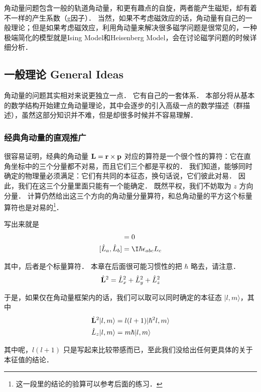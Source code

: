 
角动量问题包含一般的轨道角动量，和更有趣点的自旋，两者能产生磁矩，却有着不一样的产生系数（g因子）． 当然，如果不考虑磁效应的话，角动量有自己的一般理论；但是如果考虑磁效应，利用角动量来解决很多磁学问题是很常见的，一种极端简化的模型就是Ising Model和Heisenberg Model，会在讨论磁学问题的时候详细分析．

\subsection{一般理论 General Ideas}

角动量的问题其实相对来说更独立一点． 它有自己的一套体系． 本部分将从基本的数学结构开始建立角动量理论，其中会逐步的引入高级一点的数学描述（群描述），虽然这部分知识并不难，但是却很多时候并不容易理解．

\subsubsection{经典角动量的直观推广}

很容易证明，经典的角动量 $\bf L = r\times p$ 对应的算符是一个很个性的算符：它在直角坐标中的三个分量都不对易，而且它们三个都是平权的． 我们知道，能够同时确定的物理量必须满足：它们有共同的本征态，换句话说，它们彼此对易． 因此，我们在这三个分量里面只能有一个能确定． 既然平权，我们不妨取为 $z$ 方向分量． 计算仍然给出这三个方向的角动量分量算符，和总角动量的平方这个标量算符也是对易的\footnote{这一段里的结论的验算可以参考后面的练习．}．

写出来就是
\begin{align}
[\hat L_z, \hat{\bf L}^2] &= 0 \label{QMAM_eq1}\\
[\hat L_a, \hat L_b] &= \I\hbar\epsilon_{abc}L_c \label{QMAM_eq2}
\end{align}

其中，后者是个标量算符． 本章在后面很可能习惯性的把 $\hbar$ 略去，请注意．
\begin{equation}
\hat{\bf L}^2 = \hat L_x^2+\hat L_y^2+\hat L_z^2
\end{equation}

于是，如果仅在角动量框架内的话，我们可以取可以同时确定的本征态 $|l,m\rangle$，其中
\begin{align}
\hat{\bf L}^2|l,m\rangle &= l(l+1)|\hbar^2l,m\rangle\\
\hat L_z|l,m\rangle &= m\hbar|l,m\rangle
\end{align}

其中呢，$l(l+1)$ 只是写起来比较带感而已，至此我们没给出任何更具体的关于本征值的结论．

